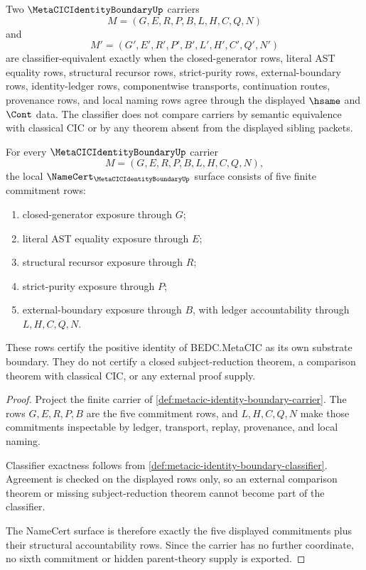 \begin{definition}
\label{def:metacic-identity-boundary-classifier}
Two $\MetaCICIdentityBoundaryUp$ carriers
$$
M=(G,E,R,P,B,L,H,C,Q,N)
$$
and
$$
M'=(G',E',R',P',B',L',H',C',Q',N')
$$
are classifier-equivalent exactly when the closed-generator rows, literal AST equality rows, structural recursor rows, strict-purity rows, external-boundary rows, identity-ledger rows, componentwise transports, continuation routes, provenance rows, and local naming rows agree through the displayed $\hsame$ and $\Cont$ data. The classifier does not compare carriers by semantic equivalence with classical CIC or by any theorem absent from the displayed sibling packets.
\end{definition}

\begin{theorem}
\label{thm:metacic-identity-boundary-namecert-obligations}
For every $\MetaCICIdentityBoundaryUp$ carrier
$$
M=(G,E,R,P,B,L,H,C,Q,N),
$$
the local $\NameCert_{\MetaCICIdentityBoundaryUp}$ surface consists of five finite commitment rows:
\begin{enumerate}
\item closed-generator exposure through $G$;
\item literal AST equality exposure through $E$;
\item structural recursor exposure through $R$;
\item strict-purity exposure through $P$;
\item external-boundary exposure through $B$, with ledger accountability through $L,H,C,Q,N$.
\end{enumerate}
These rows certify the positive identity of BEDC.MetaCIC as its own substrate boundary. They do not certify a closed subject-reduction theorem, a comparison theorem with classical CIC, or any external proof supply.
\end{theorem}
\begin{proof}
Project the finite carrier of \autoref{def:metacic-identity-boundary-carrier}. The rows $G,E,R,P,B$ are the five commitment rows, and $L,H,C,Q,N$ make those commitments inspectable by ledger, transport, replay, provenance, and local naming.

Classifier exactness follows from \autoref{def:metacic-identity-boundary-classifier}. Agreement is checked on the displayed rows only, so an external comparison theorem or missing subject-reduction theorem cannot become part of the classifier.

The NameCert surface is therefore exactly the five displayed commitments plus their structural accountability rows. Since the carrier has no further coordinate, no sixth commitment or hidden parent-theory supply is exported.
\end{proof}

